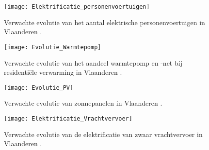 \begin{figure}[h!]
    \centering\texttt{[image: Elektrificatie\_personenvoertuigen]}
    \caption{\label{fig:Aantal_el_personenvoertuigen}Verwachte evolutie van het aantal
        elektrische personenvoertuigen in Vlaanderen \autocite{Verdoodt2022}.}
\end{figure}

\begin{figure}[h!]
    \centering\texttt{[image: Evolutie\_Warmtepomp]}
    \caption{\label{fig:Evolutie_Warmtepompen}Verwachte evolutie van het aandeel warmtepomp en -net bij
        residentiële verwarming in Vlaanderen \autocite{Verdoodt2022}.}
\end{figure}

\begin{figure}[h!]
    \centering\texttt{[image: Evolutie\_PV]}
    \caption{\label{fig:Evolutie_zonnepanelen}Verwachte evolutie van zonnepanelen in Vlaanderen \autocite{Verdoodt2022}.}
\end{figure}

\begin{figure}[h!]
    \centering\texttt{[image: Elektrificatie\_Vrachtvervoer]}
    \caption{\label{fig:El_Vrachtvervoer}Verwachte evolutie van de elektrificatie van zwaar
        vrachtvervoer in Vlaanderen \autocite{Verdoodt2022}.}
\end{figure}

